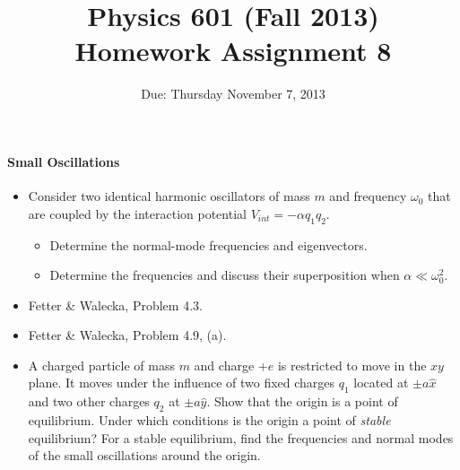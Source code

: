 \documentclass[letterpaper,11pt]{article}
\title{Physics 601 (Fall 2013) \\ Homework Assignment 8}
\date{Due: Thursday November 7, 2013}
\begin{document}
\maketitle

\paragraph*{Small Oscillations}
\begin{itemize}
 \item Consider two identical harmonic oscillators of mass $m$ and frequency $\omega_0$ that are coupled by the interaction potential $V_{int} = -\alpha q_1 q_2$.
 \begin{itemize}
  \item Determine the normal-mode frequencies and eigenvectors.
  \item Determine the frequencies and discuss their superposition when $\alpha \ll \omega_0^2$.
 \end{itemize}
 \item Fetter \& Walecka, Problem 4.3.
 \item Fetter \& Walecka, Problem 4.9, (a).
 \item A charged particle of mass $m$ and charge $+e$ is restricted to move in the $xy$ plane.  It moves under the influence of two fixed charges $q_1$ located at $\pm a \hat{x}$ and two other charges $q_2$ at $\pm a \hat{y}$.  Show that the origin is a point of equilibrium.  Under which conditions is the origin a point of \emph{stable} equilibrium?  For a stable equilibrium, find the frequencies and normal modes of the small oscillations around the origin.
\end{itemize}
\end{document}
